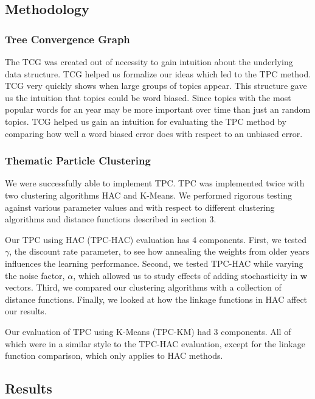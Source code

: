 \documentclass[conference]{IEEEtran}
\begin{document}
\subsection{Methodology}

\subsubsection{Tree Convergence Graph}
The TCG was created out of necessity to gain intuition about the underlying data structure. TCG helped us formalize our ideas which led to the TPC method. TCG very quickly shows when large groups of topics appear. This structure gave us the intuition that topics could be word biased. Since topics with the most popular words for an year may be more important over time than just an random topics. TCG helped us gain an intuition for evaluating the TPC method by comparing how well a word biased error does with respect to an unbiased error.

\subsubsection{Thematic Particle Clustering}
We were successfully able to implement TPC. TPC was implemented twice with two clustering algorithms HAC and K-Means. We performed rigorous testing against various parameter values and with respect to different clustering algorithms and distance functions described in section 3.

Our TPC using HAC (TPC-HAC) evaluation has 4 components. First, we tested $\gamma$, the discount rate parameter, to see how annealing the weights from older years influences the learning performance. Second, we tested TPC-HAC while varying the noise factor, $\alpha$, which allowed us to study effects of adding stochasticity in $\mathbf{w}$ vectors. Third, we compared our clustering algorithms with a collection of distance functions. Finally, we looked at how the linkage functions in HAC affect our results.

Our evaluation of TPC using K-Means (TPC-KM) had 3 components. All of which were in a similar style to the TPC-HAC evaluation, except for the linkage function comparison, which only applies to HAC methods.

\subsection{Results}
\end{document}
